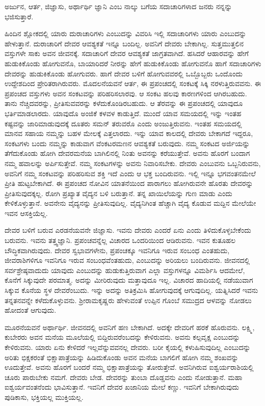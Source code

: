 \begin{artha}
ಅರ್ಜುನ, ಆರ್ತ, ಜಿಜ್ಞಾಸು, ಅರ್ಥಾರ್ಥಿ ಜ್ಞಾನಿ ಎಂಬ ನಾಲ್ಕು ಬಗೆಯ ಸದಾಚಾರಿಗಳಾದ ಜನರು ನನ್ನನ್ನು ಭಜಿಸುತ್ತಾರೆ.
\end{artha}

ಹಿಂದಿನ ಶ್ಲೋಕದಲ್ಲಿ ಯಾರು ದುರಾಚಾರಿಗಳು ಎಂಬುದನ್ನು ವಿವರಿಸಿ ಇಲ್ಲಿ ಸದಾಚಾರಿ\-ಗಳು ಯಾರು ಎಂಬುದನ್ನು ಹೇಳುತ್ತಾನೆ. ದುರಾಚಾರಿಗೆ ದೇವರ ಆವಶ್ಯಕತೆ ಇನ್ನೂ ಬಂದಿಲ್ಲ. ಅವನಿಗೆ ದೇವರು ಬೇಕಾಗಿಲ್ಲ. ಸುತ್ತಮುತ್ತಲಿನ ವಸ್ತುಗಳೇ ಸಾಕು ಅವನ ಜೀವನಕ್ಕೆ. ಸದಾಚಾರಿಗೆ ದೇವರ ಆವಶ್ಯಕತೆ ಜಾಗ್ರತವಾಗಿದೆ. ಹಸಿದರೆ ಆಹಾರವನ್ನು ಹೇಗೆ ಹುಡುಕಿಕೊಂಡು ಹೋಗುವನೊ, ಬಾಯಾರಿದರೆ ನೀರನ್ನು ಹೇಗೆ ಹುಡುಕಿಕೊಂಡು ಹೋಗುವನೊ ಹಾಗೆ ಸದಾಚಾರಿಗಳು ದೇವರನ್ನು ಹುಡುಕಿಕೊಂಡು ಹೋಗುವರು. ಹಾಗೆ ದೇವರ ಬಳಿಗೆ ಹೋಗುವವರಲ್ಲಿ ಒಬ್ಬೊಬ್ಬರು ಒಂದೊಂದು ಉದ್ದೇಶದಿಂದ ಪ್ರೇರಿತರಾಗಿರುವರು. ಮೊದಲನೆಯವನೆ ಆರ್ತ, ಈ ಪ್ರಪಂಚದಲ್ಲಿ ಸಂಕಟಕ್ಕೆ ಸಿಕ್ಕಿ ನರಳುತ್ತಿರುವವನು. ಈ ಪ್ರಪಂಚದ ವಸ್ತುಗಳು ಅವನ ಸಂಕಟವನ್ನು ಪರಿಹರಿಸಲಾರವು. ಆ ಸಂಕಟ ಹಲವು ಕಾರಣಗಳಿಂದ ಆಗಿರಬಹುದು. ತಾನು ನೆಚ್ಚಿದವರನ್ನು, ಪ್ರೀತಿಸುವವರನ್ನು ಕಳೆದುಕೊಂಡಿರಬಹುದು. ಆ ತೆರವನ್ನು ಈ ಪ್ರಪಂಚದಲ್ಲಿ ಯಾವುದೂ ಭರ್ತಿಮಾಡಲಾರದು. ಯಾವುದೊ ಅಂಜಿಕೆ ಕಳವಳ ಕಾಡುತ್ತಿದೆ. ಮುಂದೆ ಯಾವ ಸಮಯದಲ್ಲಿ ಇನ್ನು ಇಂತಹ ಕಷ್ಟವನ್ನು ಜಾರಿಮಾಡುವುದಕ್ಕೆ ದೂತರು ಸಮನ್ ತರುವರೊ ಎಂದು ಅಂಜುತ್ತಿರುವನು. ಇಂತಹ ಸಮಯದಲ್ಲಿ ಮಾನವ ಸಹಾಯ ನಮ್ಮನ್ನು ಬಹಳ ಮೇಲಕ್ಕೆ ಎತ್ತಲಾರದು. ಇನ್ನು ಯಾವ ಕಾಲದಲ್ಲಿ ದೇವರು ಬೇಕಾಗದೆ ಇದ್ದರೂ, ಸಂಕಟಗಳು ಬಂದು ನಮ್ಮನ್ನು ಕಾಡುವಾಗ ವೆಂಕಟರಮಣನ ಆವಶ್ಯಕತೆ ಬರುವುದು. ನಮ್ಮ ಸಂಕಟದ ಅರ್ಜಿಯನ್ನು ತೆಗೆದುಕೊಂಡು ಹೋಗಿ ದೇವರಮನೆಯ ಬಾಗಿಲಿನಲ್ಲಿ ನಿಂತು ಅವನನ್ನು ಕರೆಯುತ್ತೇವೆ. ಅವನು ಹೊರಗೆ ಬಂದಾಗ ನಮ್ಮ ಹವಾಲನ್ನು ಅರ್ಪಿಸುತ್ತೇವೆ. ನಮ್ಮ ಸಂಕಟಗಳನ್ನು ಅವನು ನಿವಾರಿಸಬೇಕು. ದೇವರು ಎಂಬುವನು ಒಬ್ಬನಿರುವನು, ಅವನಿಗೆ ನಮ್ಮ ಸಂಕಟವನ್ನು ಪರಿಹರಿಸುವ ಶಕ್ತಿ ಇದೆ ಎಂದು ಆ ಭಕ್ತ ಬಂದಿರುವನು. ಇಲ್ಲಿ ಇನ್ನೂ ಭಗವಂತನಮೇಲೆ ಪ್ರೀತಿ ಹುಟ್ಟಬೇಕಾಗಿದೆ. ಈ ಪ್ರಪಂಚದ ನೋವಿನ ಯಾತನೆಯಿಂದ ಪಾರಾಗಲು ಹೋಗಿರುವನೇ ಹೊರತು ದೇವರನ್ನು ಪ್ರೀತಿಸುವುದಕ್ಕಲ್ಲ. ರೋಗಿ ಪ್ರಖ್ಯಾತ ವೈದ್ಯನ ಬಳಿ ಬರುತ್ತಾನೆ. ತನ್ನ ಖಾಯಿಲೆಯನ್ನು ಗುಣ ಮಾಡು ಎಂದು ಕೇಳಿಕೊಳ್ಳುತ್ತಾನೆ. ಅವನೇನು ವೈದ್ಯನನ್ನು ಪ್ರೀತಿಸುವುದಿಲ್ಲ. ವೈದ್ಯನಿಗಿಂತ ಹೆಚ್ಚಾಗಿ ವೈದ್ಯ ಕೊಡುವ ಮದ್ದಿನ ಮೇಲೆಯೇ ಇವನ ಆಸಕ್ತಿಯೆಲ್ಲ.

ದೇವರ ಬಳಿಗೆ ಬರುವ ಎರಡನೆಯವನೇ ಜಿಜ್ಞಾಸು. ಇವನು ದೇವರು ಎಂದರೆ ಏನು ಎಂದು ತಿಳಿದುಕೊಳ್ಳಬೇಕೆಂದು ಬರುವನು. ಇವನು ತತ್ತ್ವಜ್ಞಾನಿ. ಪ್ರಪಂಚವನ್ನೆಲ್ಲ ವಿಚಾರದ ಒಂದರಿಯಿಂದ ಆಡಿರುವನು. ಇವನ ಕುತೂಹಲ ಬೌದ್ಧಿಕವಾಗಿರುವುದು. ದೇವರ ಸ್ವಭಾವಗಳೇನು, ಪ್ರಪಂಚಕ್ಕೂ ಇವನಿಗೂ ಇರುವ ಸಂಬಂಧ ಎಂತಹುದು, ಜೀವರಾಶಿಗಳಿಗೂ ಇವನಿಗೂ ಇರುವ ಸಂಬಂಧವೆಂತಹುದು, ಎಂಬುದನ್ನು ಅರಿಯಲು ಬಂದಿರುವನು. ಜೀವನದಲ್ಲಿ ಸರ್ವಶ್ರೇಷ್ಠವಾದುದು ಯಾವುದು ಎಂಬುದನ್ನು ಹುಡುಕುತ್ತಿರುವಾಗ ಎಲ್ಲಾ ವಸ್ತುಗಳನ್ನೂ ವಿಮರ್ಶಿಸಿ ಆದ\-ಮೇಲೆ, ಕೊನೆಗೆ ಸಿಕ್ಕುವುದೇ ಪರಮಾತ್ಮ. ಅದನ್ನು ಮೀರಿರುವುದು ಮತ್ತಾವುದೂ ಇಲ್ಲ. ವಿಚಾರದ ಹಾದಿಯಲ್ಲಿ ನಡೆಯುವಾಗ ಸಿಕ್ಕುವ ಕೊನೆಯ ಸ್ಥಳ ದೇವರೆಂಬುದು. ಇನ್ನು ಅದನ್ನು ಅತಿಕ್ರಮಿಸಿ ಹೋಗುವುದಕ್ಕೆ ಆಗುವುದಿಲ್ಲ. ಯತ್ನಿಸಿದರೆ ಇವನು ತನ್ನತನವನ್ನೇ ಕಳೆದುಕೊಳ್ಳುವನು. ಶ‍್ರೀರಾಮಕೃಷ್ಣರು ಹೇಳುವಂತೆ ಉಪ್ಪಿನ ಗೊಂಬೆ ಸಮುದ್ರದ ಆಳವನ್ನು ನೋಡಲು ಹೋದಂತೆ ಆಗುವುದು.

ಮೂರನೆಯವನೆ ಅರ್ಥಾರ್ಥಿ. ಜೀವನದಲ್ಲಿ ಅವನಿಗೆ ಹಣ ಬೇಕಾಗಿದೆ. ಅದಕ್ಕೇ ದೇವರಿಗೆ ಹರಕೆ ಹೊರುವನು. ಲಕ್ಷ್ಮಿ, ಕುಬೇರರು ಅವನ ಮನೆಯ ಮೂಲೆಯಲ್ಲಿ ಬಿದ್ದಿರುವರೆಂಬದನ್ನು ಕೇಳಿರುವನು. ಅವನು ಕಲ್ಪವೃಕ್ಷ ಎಂಬುದನ್ನು ಕೇಳಿರುವನು. ಯಾರು ಏನು ಕೇಳಿದರೆ ಇಲ್ಲವೆನ್ನುವವನಲ್ಲ ದೇವರು. ಬರೀ ಕೈಯಲ್ಲಿ ಕಳುಹಿಸುವುದಿಲ್ಲ ಎಂಬುದನ್ನು ಅರಿತು ಭಿಕ್ಷಕರಂತೆ ಭಿಕ್ಷಾಪಾತ್ರೆಯನ್ನು ಹಿಡಿದುಕೊಂಡು ಅವನ ಮನೆಯ ಬಾಗಲಿಗೆ ಹೋಗಿ ನಮ್ಮ ಶಂಖವನ್ನು ಊದುತ್ತೇವೆ. ಅವನು ಹೊರಗೆ ಬಂದರೆ ನಮ್ಮ ಭಿಕ್ಷಾಪಾತ್ರೆಯನ್ನು ತೋರುತ್ತೇವೆ. ಅವನಿಗಿರುವ ಐಶ್ವರ್ಯರಾಶಿಯಲ್ಲಿ ಚೂರು ಪಾರುಬೇಕು ನಮಗೆ. ದೇವರು ಬೇಡ. ದೇವರನ್ನು ತುಂಬಾ ದೊಡ್ಡವನು ಎಂದು ನೋಡುತ್ತಾನೆ. ಮಹಾ ಐಶ್ವರ್ಯವಂತನೆಂದು ಭಾವಿಸುತ್ತಾನೆ. ಇವನಿಗೆ ದೇವರ ಖಜಾನಿಯ ಮೇಲೆ ಕಣ್ಣು. ಇವನಿಗೆ ಬೇಕಾಗಿರುವುದು ಪುಡಿಕಾಸು, ಭಕ್ತಿಯಲ್ಲ ಮುಕ್ತಿಯಲ್ಲ.

